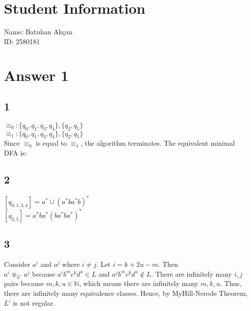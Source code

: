 \documentclass{article}
\begin{document}
\section*{Student Information}
Name: Batuhan Akçan \\
ID: 2580181 \\

\section*{Answer 1}
\subsection*{1}
$ \equiv_0 : \{q_0, q_1, q_3, q_4\}, \{q_2, q_5\}$\\
$ \equiv_1 : \{q_0, q_1, q_3, q_4\}, \{q_2, q_5\} $\\
Since $\equiv_0 \; $is equal to$ \; \equiv_1$, the algorithm terminates. The equivalent minimal DFA is:\\


\subsection*{2}
$[q_{0,1,3,4}] = a^* \cup (a^*ba^*b)^*$\\
$[q_{2,5}] = a^*ba^*(ba^*ba^*)^* $

\subsection*{3}
Consider $a^i$ and $a^j$ where $i \neq j$. Let $i = k+2u-m.$ Then\\
$a^i \not\approx_{L'} a^j$ because $a^ib^mc^kd^u \in L$ and $a^jb^mc^kd^u \not\in L.$ There are infinitely many $i,j$ pairs because $m,k,u \in \mathbb{N}$, which means there are infinitely many $m,k,u.$ Thus, there are infinitely many equivalence classes. Hence, by MyHill-Nerode Theorem, $L'$ is not regular.
\end{document}

